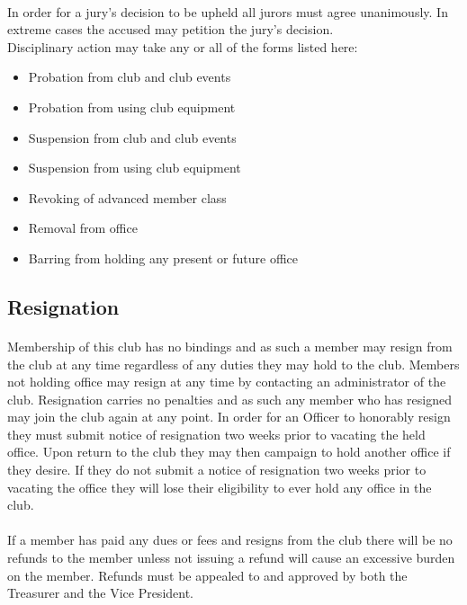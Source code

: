 \documentclass[12pt]{article}
\begin{document}
\paragraph{}
In order for a jury's decision to be upheld all jurors must agree unanimously. In extreme cases the accused may petition the jury's decision.  
\\
Disciplinary action may take any or all of the forms listed here:
\begin{itemize}
\item Probation from club and club events
\item Probation from using club equipment
\item Suspension from club and club events
\item Suspension from using club equipment
\item Revoking of advanced member class
\item Removal from office
\item Barring from holding any present or future office

\end{itemize}

\subsection{Resignation}
\paragraph{}
Membership of this club has no bindings and as such a member may resign from the club at any time regardless of any duties they may hold to the club. Members not holding office may resign at any time by contacting an administrator of the club. Resignation carries no penalties and as such any member who has resigned may join the club again at any point. In order for an Officer to honorably resign they must submit notice of resignation two weeks prior to vacating the held office. Upon return to the club they may then campaign to hold another office if they desire. If they do not submit a notice of resignation two weeks prior to vacating the office they will lose their eligibility to ever hold any office in the club. 

\paragraph{}
If a member has paid any dues or fees and resigns from the club there will be no refunds to the member unless not issuing a refund will cause an excessive burden on the member. Refunds must be appealed to and approved by both the Treasurer and the Vice President.
\end{document}
